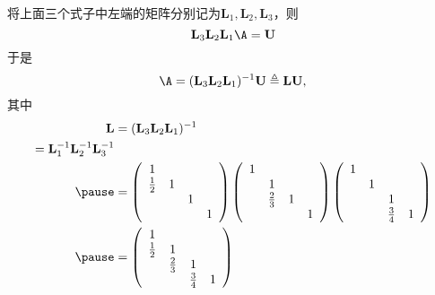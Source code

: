 \begin{frame}\ft{\secname}
\begin{jie}[续]
	将上面三个式子中左端的矩阵分别记为$\mathbf{L}_1,\mathbf{L}_2,\mathbf{L}_3$，则
	$$
	\mathbf{L}_3\mathbf{L}_2\mathbf{L}_1 \A = \mathbf{U}
	$$\pause 
  于是
  $$
  \A = (\mathbf{L}_3\mathbf{L}_2\mathbf{L}_1)^{-1}\mathbf{U} \triangleq \mathbf{L}\mathbf{U},
  $$\pause
  其中
  $$
  \begin{aligned}
    \mathbf{L}
    &=  (\mathbf{L}_3\mathbf{L}_2\mathbf{L}_1)^{-1} \\ =  \mathbf{L}_1^{-1}\mathbf{L}_2^{-1}\mathbf{L}_3^{-1}\\ \pause
    &=   
        \left(
        \begin{array}{cccc}
          1 & && \\
          \frac12 &1&&\\
            &&1&\\
            &&&1
        \end{array}
                \right)
                \left(
                \begin{array}{cccc}
                  1 & && \\
                    &1&&\\
                    &\frac23&1&\\
                    &&&1
                \end{array}
                        \right)
                        \left(
                        \begin{array}{cccc}
                          1 & && \\
                            &1&&\\
                            &&1&\\
                            &&\frac34&1
                        \end{array}
                                       \right) \\ \pause
    &=   \left(
        \begin{array}{cccc}
          1 & && \\
          \frac12 &1&&\\
            &\frac23&1&\\
            &&\frac34&1
        \end{array}
                       \right)
  \end{aligned}    
  $$
\end{jie}
 
\end{frame}

